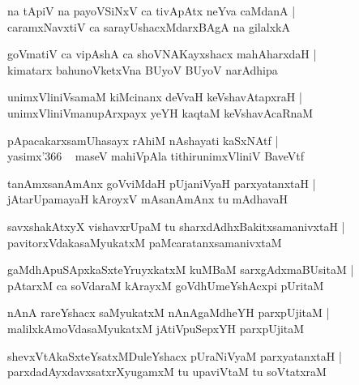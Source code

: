 \documentclass[twoside,12pt,openright]{book}
\newcounter{shloka}[chapter]
\begin{document}
\begin{shloka}%
na tApiV na payoVSiNxV ca tivApAtx neYva caMdanA |\\
caramxNavxtiV ca sarayUshacxMdarxBAgA na gilalxkA
\end{shloka}

\begin{shloka}%
goVmatiV ca vipAshA ca shoVNAKayxshacx mahAharxdaH |\\
kimatarx bahunoVketxVna BUyoV BUyoV narAdhipa
\end{shloka}

\begin{shloka}%
unimxVliniVsamaM kiMcinanx deVvaH keVshavAtapxraH |\\
unimxVliniVmanupArxpayx yeYH kaqtaM keVshavAcaRnaM 
\end{shloka}

\begin{shloka}%
pApacakarxsamUhasayx rAhiM nAshayati kaSxNAtf |\\
yasimx\char'366 ~ maseV mahiVpAla tithirunimxVliniV BaveVtf
\end{shloka}

\begin{shloka}%
tanAmxsanAmAnx goVviMdaH pUjaniVyaH parxyatanxtaH |\\
jAtarUpamayaH kAroyxV mAsanAmAnx tu mAdhavaH 
\end{shloka}

\begin{shloka}%
savxshakAtxyX vishavxrUpaM tu sharxdAdhxBakitxsamanivxtaH |\\
pavitorxVdakasaMyukatxM paMcaratanxsamanivxtaM
\end{shloka}

\begin{shloka}%
gaMdhApuSApxkaSxteYruyxkatxM kuMBaM sarxgAdxmaBUsitaM |\\
pAtarxM ca soVdaraM kArayxM goVdhUmeYshAcxpi pUritaM 
\end{shloka}

\begin{shloka}%
nAnA rareYshacx saMyukatxM nAnAgaMdheYH parxpUjitaM |\\
malilxkAmoVdasaMyukatxM jAtiVpuSepxYH parxpUjitaM
\end{shloka}

\begin{shloka}%
shevxVtAkaSxteYsatxMDuleYshacx pUraNiVyaM parxyatanxtaH |\\
parxdadAyxdavxsatxrXyugamxM tu upaviVtaM tu soVtatxraM 
\end{shloka}
\end{document}
